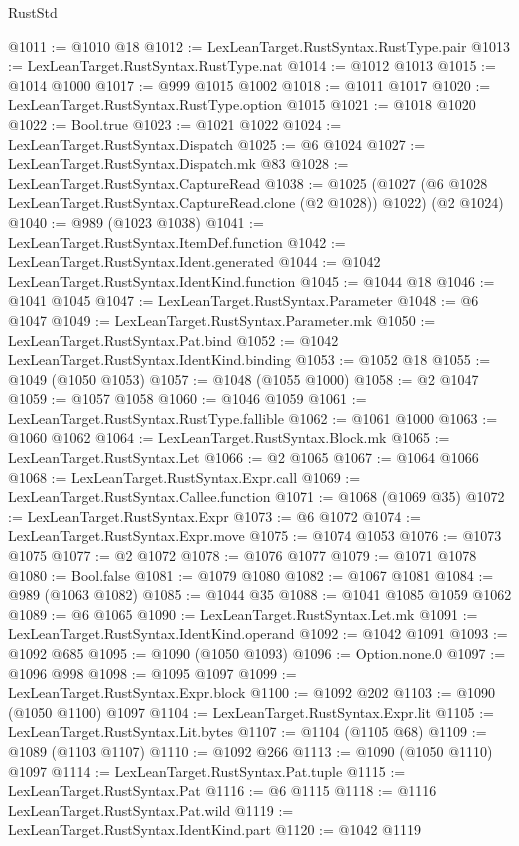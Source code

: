 \begin{lexlean}{RustStd}
\begin{coremodule}
@1011 := @1010 @18
@1012 := LexLeanTarget.RustSyntax.RustType.pair
@1013 := LexLeanTarget.RustSyntax.RustType.nat
@1014 := @1012 @1013
@1015 := @1014 @1000
@1017 := @999 @1015 @1002
@1018 := @1011 @1017
@1020 := LexLeanTarget.RustSyntax.RustType.option @1015
@1021 := @1018 @1020
@1022 := Bool.true
@1023 := @1021 @1022
@1024 := LexLeanTarget.RustSyntax.Dispatch
@1025 := @6 @1024
@1027 := LexLeanTarget.RustSyntax.Dispatch.mk @83
@1028 := LexLeanTarget.RustSyntax.CaptureRead
@1038 := @1025
    (@1027 (@6 @1028 LexLeanTarget.RustSyntax.CaptureRead.clone (@2 @1028)) @1022)
    (@2 @1024)
@1040 := @989 (@1023 @1038)
@1041 := LexLeanTarget.RustSyntax.ItemDef.function
@1042 := LexLeanTarget.RustSyntax.Ident.generated
@1044 := @1042 LexLeanTarget.RustSyntax.IdentKind.function
@1045 := @1044 @18
@1046 := @1041 @1045
@1047 := LexLeanTarget.RustSyntax.Parameter
@1048 := @6 @1047
@1049 := LexLeanTarget.RustSyntax.Parameter.mk
@1050 := LexLeanTarget.RustSyntax.Pat.bind
@1052 := @1042 LexLeanTarget.RustSyntax.IdentKind.binding
@1053 := @1052 @18
@1055 := @1049 (@1050 @1053)
@1057 := @1048 (@1055 @1000)
@1058 := @2 @1047
@1059 := @1057 @1058
@1060 := @1046 @1059
@1061 := LexLeanTarget.RustSyntax.RustType.fallible
@1062 := @1061 @1000
@1063 := @1060 @1062
@1064 := LexLeanTarget.RustSyntax.Block.mk
@1065 := LexLeanTarget.RustSyntax.Let
@1066 := @2 @1065
@1067 := @1064 @1066
@1068 := LexLeanTarget.RustSyntax.Expr.call
@1069 := LexLeanTarget.RustSyntax.Callee.function
@1071 := @1068 (@1069 @35)
@1072 := LexLeanTarget.RustSyntax.Expr
@1073 := @6 @1072
@1074 := LexLeanTarget.RustSyntax.Expr.move
@1075 := @1074 @1053
@1076 := @1073 @1075
@1077 := @2 @1072
@1078 := @1076 @1077
@1079 := @1071 @1078
@1080 := Bool.false
@1081 := @1079 @1080
@1082 := @1067 @1081
@1084 := @989 (@1063 @1082)
@1085 := @1044 @35
@1088 := @1041 @1085 @1059 @1062
@1089 := @6 @1065
@1090 := LexLeanTarget.RustSyntax.Let.mk
@1091 := LexLeanTarget.RustSyntax.IdentKind.operand
@1092 := @1042 @1091
@1093 := @1092 @685
@1095 := @1090 (@1050 @1093)
@1096 := Option.none.{0}
@1097 := @1096 @998
@1098 := @1095 @1097
@1099 := LexLeanTarget.RustSyntax.Expr.block
@1100 := @1092 @202
@1103 := @1090 (@1050 @1100) @1097
@1104 := LexLeanTarget.RustSyntax.Expr.lit
@1105 := LexLeanTarget.RustSyntax.Lit.bytes
@1107 := @1104 (@1105 @68)
@1109 := @1089 (@1103 @1107)
@1110 := @1092 @266
@1113 := @1090 (@1050 @1110) @1097
@1114 := LexLeanTarget.RustSyntax.Pat.tuple
@1115 := LexLeanTarget.RustSyntax.Pat
@1116 := @6 @1115
@1118 := @1116 LexLeanTarget.RustSyntax.Pat.wild
@1119 := LexLeanTarget.RustSyntax.IdentKind.part
@1120 := @1042 @1119

\end{coremodule}
\end{lexlean}
